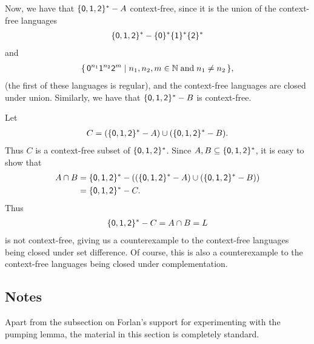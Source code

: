 Now, we have that
$\{\mathsf{0},\mathsf{1},\mathsf{2}\}^*-A$ context-free, since it is the
union of the context-free languages
\begin{gather*}
\{\mathsf{0},\mathsf{1},\mathsf{2}\}^*-\{\mathsf{0}\}^*\{\mathsf{1}\}^*\{\mathsf{2}\}^*
\end{gather*}
and
\begin{gather*}
\{ \, \mathsf{0}^{n_1}\mathsf{1}^{n_2}\mathsf{2}^m \mid n_1,n_2,m\in\mathbb{N}
\;\allowbreak\mbox{and}\allowbreak\;n_1\neq n_2 \, \} ,
\end{gather*}
(the first of these languages is regular), and the context-free languages
are closed under union.
Similarly, we have that $\{\mathsf{0},\mathsf{1},\mathsf{2}\}^*-B$ is
context-free.

Let
\begin{gather*}
C=(\{\mathsf{0},\mathsf{1},\mathsf{2}\}^*-A) \cup (\{\mathsf{0},\mathsf{1},\mathsf{2}\}^*-B) .
\end{gather*}
Thus $C$ is a context-free subset of $\{\mathsf{0},\mathsf{1},\mathsf{2}\}^*$.
Since $A,B\subseteq\{\mathsf{0},\mathsf{1},\mathsf{2}\}^*$, it is easy to show that
\begin{align*}
A\cap B &= \{\mathsf{0},\mathsf{1},\mathsf{2}\}^*-
((\{\mathsf{0},\mathsf{1},\mathsf{2}\}^*-A)\cup(\{\mathsf{0},\mathsf{1},\mathsf{2}\}^*-B)) \\
&= \{\mathsf{0},\mathsf{1},\mathsf{2}\}^*-C .
\end{align*}
Thus
\begin{gather*}
\{\mathsf{0},\mathsf{1},\mathsf{2}\}^*-C = A\cap B = L
\end{gather*}
is not context-free, giving us a counterexample to the
context-free languages being closed under set difference.
Of course, this is also a counterexample to the context-free
languages being closed under complementation.

\subsection{Notes}

Apart from the subsection on Forlan's support for experimenting with
the pumping lemma, the material in this section is completely
standard.

